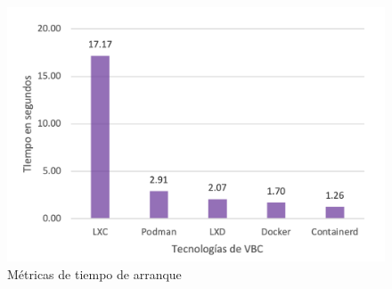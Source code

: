\begin{figure}[H]
    \centering
    \includegraphics[width=\textwidth] {tablas-images/cp4/arranque.png}
    \caption{Métricas de tiempo de arranque}\label{fig:tabla-metricas-arranque}
\end{figure}